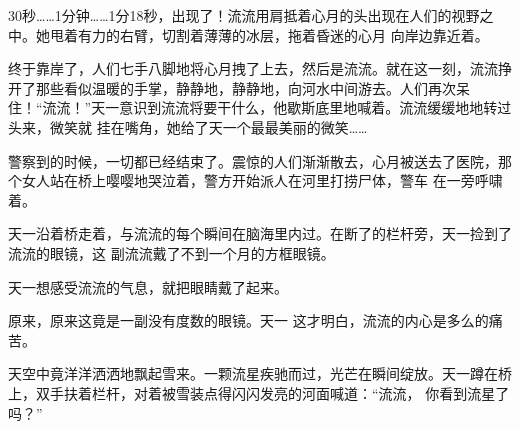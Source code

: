 \documentclass{article}
\begin{document}
30秒……1分钟……1分18秒，出现了！流流用肩抵着心月的头出现在人们的视野之中。她甩着有力的右臂，切割着薄薄的冰层，拖着昏迷的心月
向岸边靠近着。 

\newpage

终于靠岸了，人们七手八脚地将心月拽了上去，然后是流流。就在这一刻，流流挣开了那些看似温暖的手掌，静静地，静静地，向河水中间游去。人们再次呆住！“流流！”天一意识到流流将要干什么，他歇斯底里地喊着。流流缓缓地地转过头来，微笑就
挂在嘴角，她给了天一个最最美丽的微笑…… 

警察到的时候，一切都已经结束了。震惊的人们渐渐散去，心月被送去了医院，那个女人站在桥上嘤嘤地哭泣着，警方开始派人在河里打捞尸体，警车
在一旁呼啸着。 

天一沿着桥走着，与流流的每个瞬间在脑海里内过。在断了的栏杆旁，天一捡到了流流的眼镜，这
副流流戴了不到一个月的方框眼镜。 

天一想感受流流的气息，就把眼睛戴了起来。

原来，原来这竟是一副没有度数的眼镜。天一
这才明白，流流的内心是多么的痛苦。 

\newpage

天空中竟洋洋洒洒地飘起雪来。一颗流星疾驰而过，光芒在瞬间绽放。天一蹲在桥上，双手扶着栏杆，对着被雪装点得闪闪发亮的河面喊道：“流流，
你看到流星了吗？” 
\end{document}
